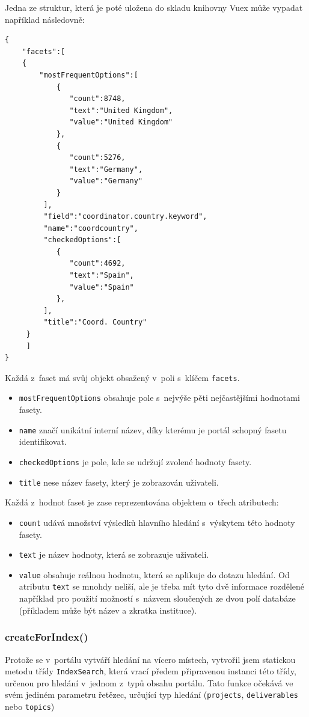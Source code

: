 Jedna ze struktur, která je poté uložena do skladu knihovny Vuex může vypadat například následovně:

\begin{verbatim}
{
    "facets":[
    {
        "mostFrequentOptions":[  
            {  
               "count":8748,
               "text":"United Kingdom",
               "value":"United Kingdom"
            },
            {  
               "count":5276,
               "text":"Germany",
               "value":"Germany"
            }
         ],
         "field":"coordinator.country.keyword",
         "name":"coordcountry",
         "checkedOptions":[  
            {  
               "count":4692,
               "text":"Spain",
               "value":"Spain"
            },
         ],
         "title":"Coord. Country"
     }
     ]
}
\end{verbatim}
Každá z~faset má svůj objekt obsažený v~poli s~klíčem \texttt{facets}.
\begin{itemize}
\item \texttt{mostFrequentOptions} obsahuje pole s~nejvýše pěti nejčastějšími hodnotami fasety.
\item \texttt{name} značí unikátní interní název, díky kterému je portál schopný fasetu identifikovat.
\item \texttt{checkedOptions} je pole, kde se udržují zvolené hodnoty fasety.
\item \texttt{title} nese název fasety, který je zobrazován uživateli.
\end{itemize}
Každá z~hodnot faset je zase reprezentována objektem o~třech atributech:
\begin{itemize}
\item \texttt{count} udává množství výsledků hlavního hledání s~výskytem této hodnoty fasety.
\item \texttt{text} je název hodnoty, která se zobrazuje uživateli.
\item \texttt{value} obsahuje reálnou hodnotu, která se aplikuje do dotazu hledání. Od atributu \texttt{text} se mnohdy neliší, ale je třeba mít tyto dvě informace rozdělené například pro použití možností s~názvem sloučených ze dvou polí databáze (příkladem může být název a zkratka instituce).
\end{itemize}

\subsubsection*{createForIndex()}
Protože se v~portálu vytváří hledání na vícero místech, vytvořil jsem statickou metodu třídy \texttt{IndexSearch}, která vrací předem připravenou instanci této třídy, určenou pro hledání v~jednom z~typů obsahu portálu. Tato funkce očekává ve svém jediném parametru řetězec, určující typ hledání (\texttt{projects}, \texttt{deliverables} nebo \texttt{topics})

